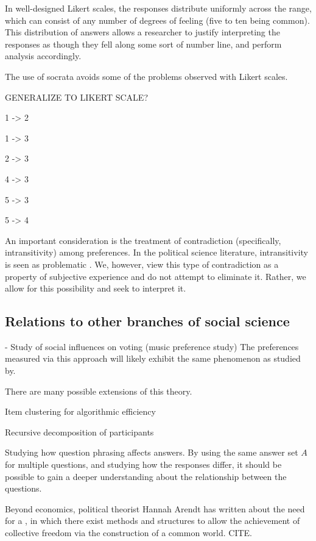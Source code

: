 \documentclass[12pt]{book}
\begin{document}
In well-designed Likert scales, the responses distribute uniformly across the range, which can consist of any number of degrees of feeling (five to ten being common). This distribution of answers allows a researcher to justify interpreting the responses as though they fell along some sort of number line, and perform analysis accordingly.

The use of socrata avoids some of the problems observed with Likert scales. 

GENERALIZE TO LIKERT SCALE?

1 -> 2

1 -> 3

2 -> 3

4 -> 3

5 -> 3

5 -> 4


An important consideration is the treatment of contradiction (specifically, intransitivity) among preferences. In the political science literature, intransitivity is seen as problematic \cite{arrow}. We, however, view this type of contradiction as a property of subjective experience and do not attempt to eliminate it. Rather, we allow for this possibility and seek to interpret it.

\subsection{Relations to other branches of social science}

- Study of social influences on voting (music preference study)
The preferences measured via this approach will likely exhibit the same phenomenon as studied by.

There are many possible extensions of this theory.

Item clustering for algorithmic efficiency

Recursive decomposition of participants

Studying how question phrasing affects answers. By using the same answer set $A$ for multiple questions, and studying how the responses differ, it should be possible to gain a deeper understanding about the relationship between the questions.

Beyond economics, political theorist Hannah Arendt has written about the need for a , in which there exist methods and structures to allow the achievement of collective freedom via the construction of a common world. CITE.


\printbibliography
\end{document}
